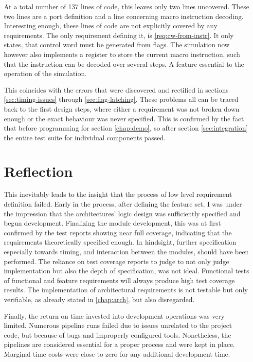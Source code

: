 At a total number of 137 lines of code, this leaves only two lines uncovered. These two lines are a port definition and a line concerning macro instruction decoding. Interesting enough, these lines of code are not explicitly covered by any requirements. The only requirement defining it, is \ref{req:cw-from-instr}. It only states, that control word must be generated from flags. The simulation now however also implements a register to store the current macro instruction, such that the instruction can be decoded over several steps. A feature essential to the operation of the simulation. 

This coincides with the errors that were discovered and rectified in sections \ref{sec:timing-issues} through \ref{sec:flag-latching}. These problems all can be traced back to the first design steps, where either a requirement was not broken down enough or the exact behaviour was never specified. This is confirmed by the fact that before programming for section \ref{chap:demo}, so after section \ref{sec:integration} the entire test suite for individual components passed.

\section{Reflection}
This inevitably leads to the insight that the process of low level requirement definition failed. 
Early in the process, after defining the feature set, I was under the impression that the architectures' logic design was sufficiently specified and begun development. Finalizing the module development, this was at first confirmed by the test reports showing near full coverage, indicating that the requirements theoretically specified enough. In hindsight, further specification especially towards timing, and interaction between the modules, should have been performed. The reliance on test coverage reports to judge to not only judge implementation but also the depth of specification, was not ideal. Functional tests of functional and feature requirements will always produce high test coverage results. The implementation of architectural requirements is not testable but only verifiable, as already stated in \ref{chap:arch}, but also disregarded.

Finally, the return on time invested into development operations was very limited. Numerous pipeline runs failed due to issues unrelated to the project code, but because of bugs and improperly configured tools. Nonetheless, the pipelines are considered essential for a proper process and were kept in place. Marginal time costs were close to zero for any additional development time.

